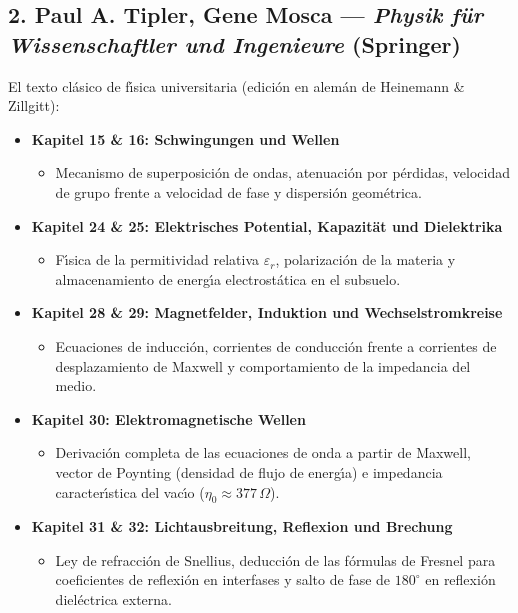 \documentclass[11pt,a4paper]{article}
\begin{document}
\subsection{2. Paul A. Tipler, Gene Mosca --- \textit{Physik f{\"u}r Wissenschaftler und Ingenieure} (Springer)}
El texto cl{\'a}sico de f{\'\i}sica universitaria (edici{\'o}n en alem{\'a}n de Heinemann \& Zillgitt):
\begin{itemize}
    \item \textbf{Kapitel 15 \& 16: Schwingungen und Wellen}
    \begin{itemize}
        \item Mecanismo de superposici{\'o}n de ondas, atenuaci{\'o}n por p{\'e}rdidas, velocidad de grupo frente a velocidad de fase y dispersi{\'o}n geom{\'e}trica.
    \end{itemize}
    \item \textbf{Kapitel 24 \& 25: Elektrisches Potential, Kapazit{\"a}t und Dielektrika}
    \begin{itemize}
        \item F{\'\i}sica de la permitividad relativa $\varepsilon_r$, polarizaci{\'o}n de la materia y almacenamiento de energ{\'\i}a electrost{\'a}tica en el subsuelo.
    \end{itemize}
    \item \textbf{Kapitel 28 \& 29: Magnetfelder, Induktion und Wechselstromkreise}
    \begin{itemize}
        \item Ecuaciones de inducci{\'o}n, corrientes de conducci{\'o}n frente a corrientes de desplazamiento de Maxwell y comportamiento de la impedancia del medio.
    \end{itemize}
    \item \textbf{Kapitel 30: Elektromagnetische Wellen}
    \begin{itemize}
        \item Derivaci{\'o}n completa de las ecuaciones de onda a partir de Maxwell, vector de Poynting (densidad de flujo de energ{\'\i}a) e impedancia caracter{\'\i}stica del vac{\'\i}o ($\eta_0 \approx 377\,\Omega$).
    \end{itemize}
    \item \textbf{Kapitel 31 \& 32: Lichtausbreitung, Reflexion und Brechung}
    \begin{itemize}
        \item Ley de refracci{\'o}n de Snellius, deducci{\'o}n de las f{\'o}rmulas de Fresnel para coeficientes de reflexi{\'o}n en interfases y salto de fase de $180^\circ$ en reflexi{\'o}n diel{\'e}ctrica externa.
    \end{itemize}
\end{itemize}
\end{document}
